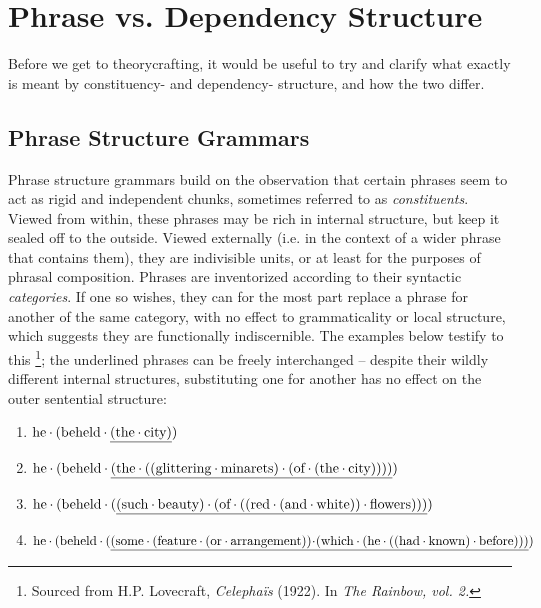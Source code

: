 \section{Phrase vs. Dependency Structure}
Before we get to theorycrafting, it would be useful to try and clarify what exactly is meant by constituency- and dependency- structure, and how the two differ.

\subsection{Phrase Structure Grammars}
Phrase structure grammars build on the observation that certain phrases seem to act as rigid and independent chunks, sometimes referred to as \textit{constituents}. 
Viewed from within, these phrases may be rich in internal structure, but keep it sealed off to the outside.
Viewed externally (i.e. in the context of a wider phrase that contains them), they are indivisible units, or at least for the purposes of phrasal composition.
Phrases are inventorized according to their syntactic \textit{categories}.
If one so wishes, they can for the most part replace a phrase for another of the same category, with no effect to grammaticality or local structure, which suggests they are functionally indiscernible.
The examples below testify to this%
\footnote{Sourced from H.P. Lovecraft, \textit{Celepha\"{i}s}  (1922). In \textit{The Rainbow, vol. 2.}}; the underlined phrases can be freely interchanged -- despite their wildly different internal structures, substituting one for another has no effect on the outer sentential structure:

{\smaller%
\begin{enumerate}
\item $\text{he}\mkern-0.5mu\cdot\mkern-0.5mu (\text{beheld}\mkern-0.5mu\cdot\mkern-0.5mu \underline{(\text{the}\mkern-0.5mu\cdot\mkern-0.5mu \text{city})})$
\item $\text{he}\mkern-0.5mu\cdot\mkern-0.5mu (\text{beheld}\mkern-0.5mu\cdot\mkern-0.5mu \underline{(\text{the}\mkern-0.5mu\cdot\mkern-0.5mu ((\text{glittering}\mkern-0.5mu\cdot\mkern-0.5mu {\text{minarets}})\mkern-0.5mu\cdot\mkern-0.5mu (\text{of}\mkern-0.5mu\cdot\mkern-0.5mu (\text{the}\mkern-0.5mu\cdot\mkern-0.5mu \text{city}))))})$
\item $\text{he}\mkern-0.5mu\cdot\mkern-0.5mu (\text{beheld}\mkern-0.5mu\cdot\mkern-0.5mu (\underline{(\text{such}\mkern-0.5mu\cdot\mkern-0.5mu \text{beauty})\mkern-0.5mu\cdot\mkern-0.5mu (\text{of}\mkern-0.5mu\cdot\mkern-0.5mu ((\text{red}\mkern-0.5mu\cdot\mkern-0.5mu (\text{and}\mkern-0.5mu\cdot\mkern-0.5mu \text{white}))\mkern-0.5mu\cdot\mkern-0.5mu \text{flowers})))})$
\item $\text{he}\mkern-0.5mu\cdot\mkern-0.5mu (\text{beheld}\mkern-0.5mu\cdot\mkern-0.5mu (\underline{
	(
		\text{some}\mkern-0.5mu\cdot\mkern-0.5mu 
			(\text{feature}\mkern-0.5mu\cdot\mkern-0.5mu 
				(\text{or}\mkern-0.5mu\cdot\mkern-0.5mu \text{arrangement})
			)\!\mkern-0.5mu\cdot\mkern-0.5mu \!
			(\text{which}\mkern-0.5mu\cdot\mkern-0.5mu 
				(\text{he}\mkern-0.5mu\cdot\mkern-0.5mu 
					(
						(\text{had}\mkern-0.5mu\cdot\mkern-0.5mu \text{known})\mkern-0.5mu\cdot\mkern-0.5mu 
						\text{before}
					)					
				)
			)})$
\end{enumerate}}%

